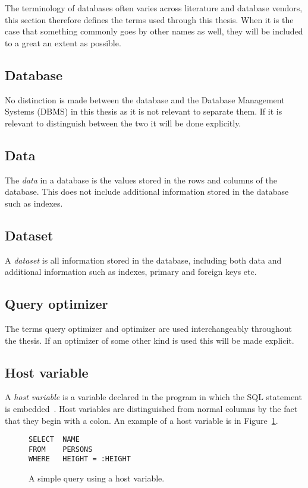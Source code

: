 The terminology of databases often varies across literature and database vendors, this section therefore defines the terms used through this thesis. When it is the case that something commonly goes by other names as well, they will be included to a great an extent as possible.

\subsection*{Database}
No distinction is made between the database and the Database Management Systems (DBMS) in this thesis as it is not relevant to separate them. If it is relevant to distinguish between the two it will be done explicitly.

\subsection*{Data}
The \textit{data} in a database is the values stored in the rows and columns of the database. This does not include additional information stored in the database such as indexes.

\subsection*{Dataset}
A \textit{dataset} is all information stored in the database, including both data and additional information such as indexes, primary and foreign keys etc.

\subsection*{Query optimizer}
The terms query optimizer and optimizer are used interchangeably throughout the thesis. If an optimizer of some other kind is used this will be made explicit.

\subsection*{Host variable}
A \textit{host variable} is a variable declared in the program in which the SQL statement is embedded~\cite[p. 151]{chamberlin_1998_complete_acgtdud}. Host variables are distinguished from normal columns by the fact that they begin with a colon. An example of a host variable is  in Figure~\ref{fig:sql:hostvar}.

\begin{figure}[ht]
\begin{verbatim}
SELECT  NAME
FROM    PERSONS
WHERE   HEIGHT = :HEIGHT
\end{verbatim}
\caption[A query with a host variable]{A simple query using a host variable.}\label{fig:sql:hostvar}
\end{figure}

